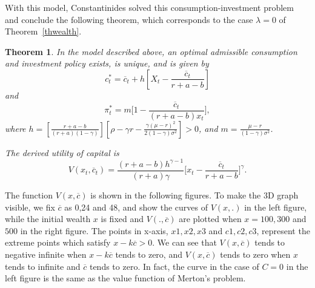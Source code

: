 \documentclass[a4paper]{article}
\newtheorem{theorem}{Theorem}[section]
\theoremstyle{definition}
\numberwithin{equation}{section}
\begin{document}
With this model, Constantinides\cite{constantinides} solved this consumption-investment problem and conclude the following theorem, which corresponds to the case $\lambda=0$ of Theorem~\ref{thwealth}.
\begin{theorem}
In the model described above, an optimal admissible consumption and investment policy exists, is unique, and is given by
$$c_t^*=\overline c_t+h[X_t-\frac{\overline c_t}{r+a-b}]$$
and
$$\pi^*_t=m\big[1-\frac{\overline c_t}{(r+a-b)x_t}\big],$$
where $h=[\frac{r+a-b}{(r+a)(1-\gamma)}][\rho-\gamma r-\frac{\gamma(\mu-r)^2}{2(1-\gamma)\sigma^2}]>0$, and $m=\frac{\mu-r}{(1-\gamma)\sigma^2}$.

The derived utility of capital is
$$V(x_t,\overline c_t)=\frac{(r+a-b)h^{\gamma-1}}{(r+a)\gamma}\big[x_t-\frac{\overline c_t}{r+a-b}\big]^\gamma.$$

\end{theorem}
\fi
The function $V(x,\overline c)$ is shown in the following figures. To make the 3D graph visible, we fix $\overline c$ as 0,24 and 48, and show the curves of $V(x,.)$ in the left figure, while the initial wealth $x$ is fixed and $V(.,\overline c)$ are plotted when $x=100,300$ and $500$ in the right figure. The points in x-axis, $x1,x2,x3$ and $c1,c2,c3$, represent the extreme points which satisfy $x-k\overline c>0$. We can see that $V(x,\overline c)$ tends to negative infinite when $x-k\overline c$ tends to zero, and $V(x,\overline c)$ tends to zero when $x$ tends to infinite and $\overline c$ tends to zero. In fact, the curve in the case of $C=0$ in the left figure is the same as the value function of Merton's problem.
\end{document}
